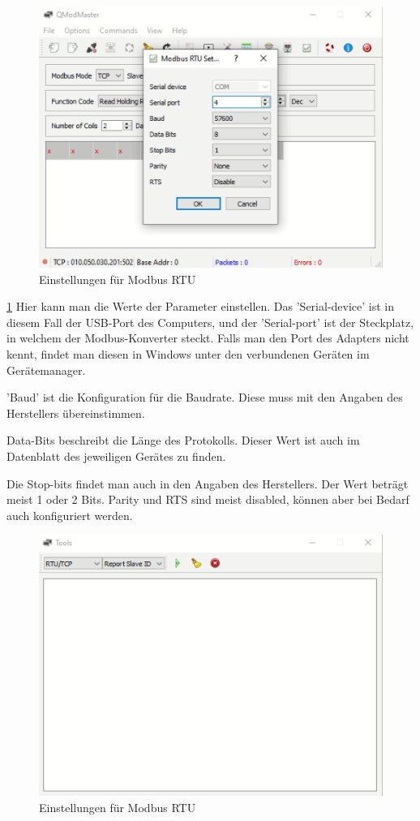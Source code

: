 \begin{figure}[h t] 
    \centering
    \includegraphics[scale=0.7]{pics/Settingsforqmodmaster.png}
    \caption{Einstellungen für Modbus RTU}
    \label{fig:impl:Settingsforqmodmaster}
\end{figure}


\ref{fig:impl:Settingsforqmodmaster} Hier kann man die Werte der Parameter einstellen. Das 'Serial-device' ist in diesem Fall der USB-Port des Computers, und der 'Serial-port' ist der Steckplatz, in welchem der Modbus-Konverter steckt. Falls man den Port des Adapters nicht kennt, findet man diesen in Windows unter den verbundenen Geräten im Gerätemanager.  

'Baud' ist die Konfiguration für die Baudrate. Diese muss mit den Angaben des Herstellers übereinstimmen.  

Data-Bits beschreibt die Länge des Protokolls. Dieser Wert ist auch im Datenblatt des jeweiligen Gerätes zu finden.  

Die Stop-bits findet man auch in den Angaben des Herstellers. Der Wert beträgt meist 1 oder 2 Bits. Parity und RTS sind meist disabled, können aber bei Bedarf auch konfiguriert werden.  

\begin{figure}[h t] 
    \centering
    \includegraphics[scale=0.7]{pics/ToolsQModbusMaster.png}
    \caption{Einstellungen für Modbus RTU}
    \label{fig:impl:ToolsQModbusMaster}
\end{figure}

